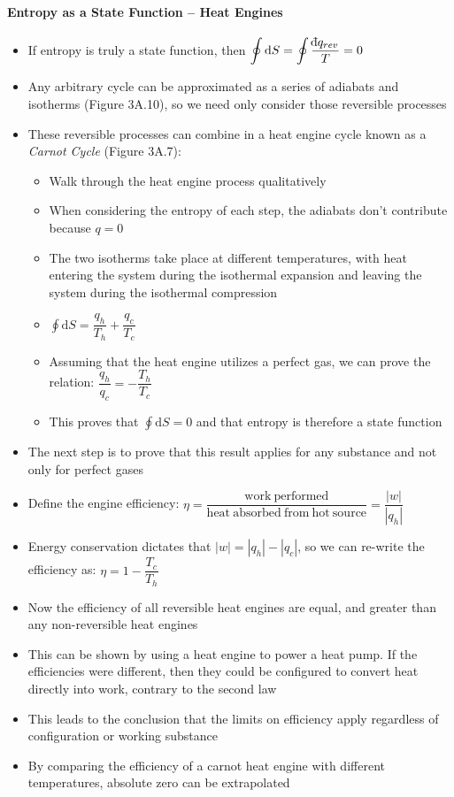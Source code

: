 \documentclass[12pt, openany, letterpaper]{memoir}
\begin{document}
\paragraph{Entropy as a State Function -- Heat Engines}
\begin{itemize}
	\item If entropy is truly a state function, then $\displaystyle\oint\mathrm{d}S = \displaystyle\oint\dfrac{\dbar q_{rev}}{T}=0$
	\item Any arbitrary cycle can be approximated as a series of adiabats and isotherms (Figure 3A.10), so we need only consider those reversible processes
	\item These reversible processes can combine in a heat engine cycle known as a \emph{Carnot Cycle} (Figure 3A.7):
	      \begin{itemize}
		      \item Walk through the heat engine process qualitatively
		      \item When considering the entropy of each step, the adiabats don't contribute because $q=0$
		      \item The two isotherms take place at different temperatures, with heat entering the system during the isothermal expansion and leaving the system during the isothermal compression
		      \item $\displaystyle\oint\mathrm{d}S = \dfrac{q_h}{T_h} + \dfrac{q_c}{T_c}$
		      \item Assuming that the heat engine utilizes a perfect gas, we can prove the relation: $\dfrac{q_h}{q_c} = -\dfrac{T_h}{T_c}$
		      \item This proves that $\displaystyle\oint\mathrm{d}S = 0$ and that entropy is therefore a state function
	      \end{itemize}
	\item The next step is to prove that this result applies for any substance and not only for perfect gases
	\item Define the engine efficiency: $\eta = \dfrac{\mathrm{work~performed}}{\mathrm{heat~absorbed~from~hot~source}} = \dfrac{|w|}{|q_h|}$
	\item Energy conservation dictates that $|w| = |q_h|-|q_c|$, so we can re-write the efficiency as: $\eta = 1 - \dfrac{T_c}{T_h}$
	\item Now the efficiency of all reversible heat engines are equal, and greater than any non-reversible heat engines
	\item This can be shown by using a heat engine to power a heat pump. If the efficiencies were different, then they could be configured to convert heat directly into work, contrary to the second law
	\item This leads to the conclusion that the limits on efficiency apply regardless of configuration or working substance
	\item By comparing the efficiency of a carnot heat engine with different temperatures, absolute zero can be extrapolated


\end{itemize}
\end{document}
